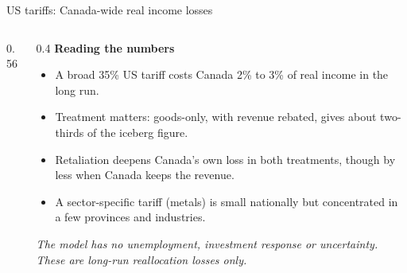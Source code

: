 \documentclass[aspectratio=169,9pt,t]{beamer}
\newcommand{\plain}[1]{{\color{ipgrey}\small\itshape #1}}
\begin{document}
\begin{frame}{US tariffs: Canada-wide real income losses}
\begin{columns}[T]
\begin{column}{0.56\textwidth}
      \bigskip
      \normalsize
      \centering
    \end{column}
    \begin{column}{0.4\textwidth}
      \textbf{Reading the numbers}
      \begin{itemize}
        \item A broad 35\% US tariff costs Canada 2\% to 3\% of real
              income in the long run.
        \item Treatment matters: goods-only, with revenue rebated, gives
              about two-thirds of the iceberg figure.
        \item Retaliation deepens Canada's own loss in both treatments,
              though by less when Canada keeps the revenue.
        \item A sector-specific tariff (metals) is small nationally but
              concentrated in a few provinces and industries.
      \end{itemize}
      \plain{The model has no unemployment, investment response or
      uncertainty. These are long-run reallocation losses only.}
    \end{column}
  \end{columns}
\end{frame}
\end{document}
